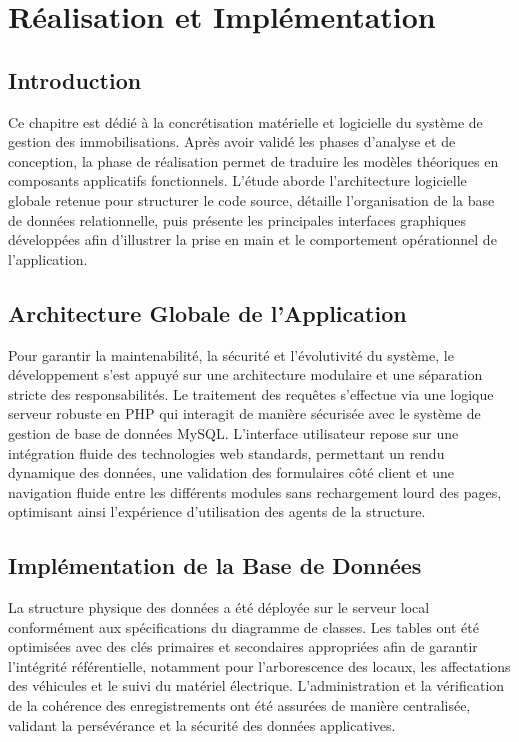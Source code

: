 \chapter{Réalisation et Implémentation}

\section{Introduction}

Ce chapitre est dédié à la concrétisation matérielle et logicielle du système de gestion des immobilisations. Après avoir validé les phases d'analyse et de conception, la phase de réalisation permet de traduire les modèles théoriques en composants applicatifs fonctionnels. L'étude aborde l'architecture logicielle globale retenue pour structurer le code source, détaille l'organisation de la base de données relationnelle, puis présente les principales interfaces graphiques développées afin d'illustrer la prise en main et le comportement opérationnel de l'application.

\section{Architecture Globale de l'Application}

Pour garantir la maintenabilité, la sécurité et l'évolutivité du système, le développement s'est appuyé sur une architecture modulaire et une séparation stricte des responsabilités. Le traitement des requêtes s'effectue via une logique serveur robuste en PHP qui interagit de manière sécurisée avec le système de gestion de base de données MySQL. L'interface utilisateur repose sur une intégration fluide des technologies web standards, permettant un rendu dynamique des données, une validation des formulaires côté client et une navigation fluide entre les différents modules sans rechargement lourd des pages, optimisant ainsi l'expérience d'utilisation des agents de la structure.

\section{Implémentation de la Base de Données}

La structure physique des données a été déployée sur le serveur local conformément aux spécifications du diagramme de classes. Les tables ont été optimisées avec des clés primaires et secondaires appropriées afin de garantir l'intégrité référentielle, notamment pour l'arborescence des locaux, les affectations des véhicules et le suivi du matériel électrique. L'administration et la vérification de la cohérence des enregistrements ont été assurées de manière centralisée, validant la persévérance et la sécurité des données applicatives.

